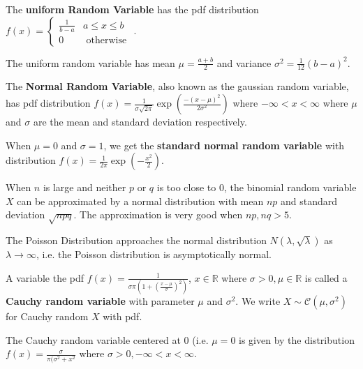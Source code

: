 \begin{defn}    
    The \textbf{uniform Random Variable} has the pdf distribution $f(x) = \begin{cases} \frac{1}{b-a} & a \leq x \leq b \\ 0 & \text { otherwise }\end{cases}$.
\end{defn}

The uniform random variable has mean $\mu = \frac{a + b}{2}$ and variance $\sigma^2 = \frac{1}{12} (b-a)^2$.

\begin{defn}
    The \textbf{Normal Random Variable}, also known as the gaussian random variable, has pdf distribution $f(x) = \frac{1}{\sigma \sqrt{2 \pi}}  \exp\left(\displaystyle \frac{-(x-\mu)^2}{2 \sigma^2}\right)$ where $-\infty < x < \infty$ where $\mu$ and $\sigma$ are the mean and standard deviation respectively.
\end{defn}

When $\mu = 0$ and $\sigma = 1$, we get the \textbf{standard normal random variable} with distribution $f(x) = \displaystyle\frac{1}{2\pi} \exp(-\frac{x^2}{2})$.

\begin{prop}
    When $n$ is large and neither $p$ or $q$ is too close to $0$, the binomial random variable $X$ can be approximated by a normal distribution with mean $np$ and standard deviation $\sqrt{npq}$. The approximation is very good when $np, nq > 5$.
\end{prop}

\begin{prop}
    The Poisson Distribution approaches the normal distribution $N(\lambda, \sqrt{\lambda})$ as $\lambda \to \infty$, i.e. the Poisson distribution is asymptotically normal.
\end{prop}

\begin{defn}
    A variable the pdf $f(x) = \displaystyle \frac{1}{\sigma \pi (1 + \left( \frac{x - \mu}{\sigma} \right)^2 )}$, $x \in \mathbb{R}$ where $\sigma > 0, \mu \in \mathbb{R}$ is called a \textbf{Cauchy random variable} with parameter $\mu$ and $\sigma^2$.
    We write $X \sim \mathcal{C}(\mu, \sigma^2)$ for Cauchy random $X$ with pdf.
\end{defn}

The Cauchy random variable centered at $0$ (i.e. $\mu = 0$ is given by the distribution $f(x) = \displaystyle \frac{\sigma}{\pi ( \sigma^2 + x^2}$ where $\sigma > 0, -\infty < x < \infty$.

